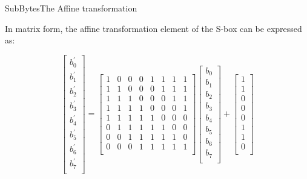 \begin{frame}[t]{SubBytes}{The Affine transformation}
	
	In matrix form, the affine transformation element of the S-box can be expressed as:
	
	\[
	\begin{bmatrix}
	b_0^{'} \\
	b_1^{'} \\
	b_2^{'} \\
	b_3^{'} \\
	b_4^{'} \\
	b_5^{'} \\
	b_6^{'} \\
	b_7^{'} \\	
	\end{bmatrix}
	=
	\begin{bmatrix}
	1 & 0 & 0 & 0 & 1 & 1 & 1 & 1\\
	1 & 1 & 0 & 0 & 0 & 1 & 1 & 1\\
	1 & 1 & 1 & 0 & 0 & 0 & 1 & 1\\
	1 & 1 & 1 & 1 & 0 & 0 & 0 & 1\\
	1 & 1 & 1 & 1 & 1 & 0 & 0 & 0\\
	0 & 1 & 1 & 1 & 1 & 1 & 0 & 0\\
	0 & 0 & 1 & 1 & 1 & 1 & 1 & 0\\
	0 & 0 & 0 & 1 & 1 & 1 & 1 & 1\\

	\end{bmatrix}
	\begin{bmatrix}
	b_0 \\
	b_1 \\
	b_2 \\
	b_3 \\
	b_4 \\
	b_5 \\
	b_6 \\
	b_7 \\	
	\end{bmatrix}
	+
	\begin{bmatrix}
	1 \\
	1 \\
	0 \\
	0 \\
	0 \\
	1 \\
	1 \\
	0 \\	
	\end{bmatrix}
	\]

\end{frame}

